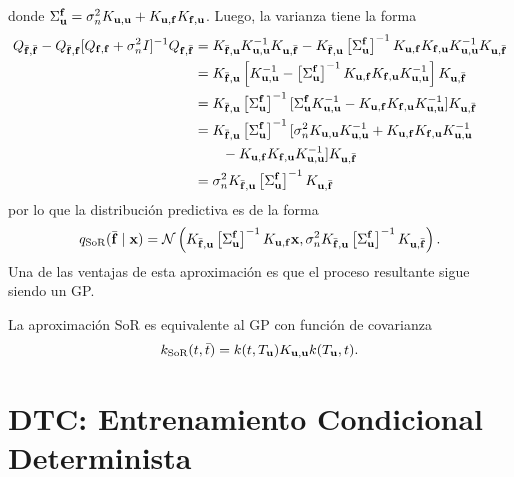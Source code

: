donde \(\Sigma_{\mathbf{u}}^{\mathbf{f}} = \sigma_n^2 K_{\mathbf{u}, \mathbf{u}} + K_{\mathbf{u}, \mathbf{f}} K_{\mathbf{f}, \mathbf{u}}\). Luego, la varianza tiene la forma
\begin{align*}
	Q_{\bar{\mathbf{f}}, \bar{\mathbf{f}}} - Q_{\bar{\mathbf{f}}, \mathbf{f}} [Q_{\mathbf{f}, \mathbf{f}} + \sigma_n^2 I]^{-1} Q_{\mathbf{f}, \bar{\mathbf{f}}}	&= K_{\bar{\mathbf{f}}, \mathbf{u}} K_{\mathbf{u}, \mathbf{u}}^{-1} K_{\mathbf{u}, \bar{\mathbf{f}}} - K_{\bar{\mathbf{f}}, \mathbf{u}}\left[\Sigma_{\mathbf{u}}^{\mathbf{f}}\right]^{-1} K_{\mathbf{u}, \mathbf{f}} K_{\mathbf{f}, \mathbf{u}} K_{\mathbf{u}, \mathbf{u}}^{-1} K_{\mathbf{u}, \bar{\mathbf{f}}} \\
	&= K_{\bar{\mathbf{f}}, \mathbf{u}}\left[K_{\mathbf{u}, \mathbf{u}}^{-1} - \left[\Sigma_{\mathbf{u}}^{\mathbf{f}}\right]^{-1} K_{\mathbf{u}, \mathbf{f}} K_{\mathbf{f}, \mathbf{u}} K_{\mathbf{u}, \mathbf{u}}^{-1}\right] K_{\mathbf{u}, \bar{\mathbf{f}}} \\
	&= K_{\bar{\mathbf{f}}, \mathbf{u}}\left[\Sigma_{\mathbf{u}}^{\mathbf{f}}\right]^{-1} [\Sigma_{\mathbf{u}}^{\mathbf{f}} K_{\mathbf{u},\mathbf{u}}^{-1} - K_{\mathbf{u}, \mathbf{f}} K_{\mathbf{f}, \mathbf{u}} K_{\mathbf{u}, \mathbf{u}}^{-1}] K_{\mathbf{u}, \bar{\mathbf{f}}} \\
	&= K_{\bar{\mathbf{f}}, \mathbf{u}}\left[\Sigma_{\mathbf{u}}^{\mathbf{f}}\right]^{-1} [\sigma_n^2 K_{\mathbf{u}, \mathbf{u}} K_{\mathbf{u}, \mathbf{u}}^{-1} + K_{\mathbf{u}, \mathbf{f}} K_{\mathbf{f}, \mathbf{u}} K_{\mathbf{u}, \mathbf{u}}^{-1}\\
	&\qquad - K_{\mathbf{u}, \mathbf{f}} K_{\mathbf{f}, \mathbf{u}} K_{\mathbf{u}, \mathbf{u}}^{-1}] K_{\mathbf{u}, \bar{\mathbf{f}}} \\
	&= \sigma_n^2K_{\bar{\mathbf{f}},\mathbf{u}}\left[ \Sigma_{\mathbf{u}}^{\mathbf{f}}\right]^{-1}K_{\mathbf{u}, \bar{\mathbf{f}}}
\end{align*}
por lo que la distribución predictiva es de la forma
\begin{equation*}
	q_{\mathrm{SoR}}(\bar{\mathbf{f}} \mid \mathbf{x}) = \mathcal{N}\left(K_{\bar{\mathbf{f}}, \mathbf{u}} \left[\Sigma_{\mathbf{u}}^{\mathbf{f}}\right]^{-1} K_{\mathbf{u}, \mathbf{f}} \mathbf{x}, \sigma_n^2 K_{\bar{\mathbf{f}}, \mathbf{u}} \left[\Sigma_{\mathbf{u}}^{\mathbf{f}}\right]^{-1} K_{\mathbf{u}, \bar{\mathbf{f}}}\right).
\end{equation*}
Una de las ventajas de esta aproximación es que el proceso resultante sigue siendo un GP.

\begin{proposition}
	La aproximación SoR es equivalente al GP con función de covarianza
	\begin{equation*}
		k_{\mathrm{SoR}}(t, \bar{t}) = k(t, T_{\mathbf{u}}) K_{\mathbf{u}, \mathbf{u}} k(T_{\mathbf{u}}, t).
	\end{equation*}
\end{proposition}

\section{DTC: Entrenamiento Condicional Determinista}

